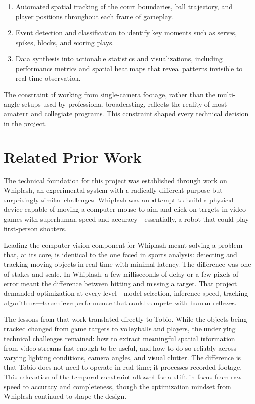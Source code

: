 \begin{enumerate}
    \item Automated spatial tracking of the court boundaries, ball trajectory, and player positions throughout each frame of gameplay.
    \item Event detection and classification to identify key moments such as serves, spikes, blocks, and scoring plays.
    \item Data synthesis into actionable statistics and visualizations, including performance metrics and spatial heat maps that reveal patterns invisible to real-time observation.
\end{enumerate}

The constraint of working from single-camera footage, rather than the multi-angle setups used by professional broadcasting, reflects the reality of most amateur and collegiate programs. This constraint shaped every technical decision in the project.

\section{Related Prior Work}

The technical foundation for this project was established through work on Whiplash, an experimental system with a radically different purpose but surprisingly similar challenges. Whiplash was an attempt to build a physical device capable of moving a computer mouse to aim and click on targets in video games with superhuman speed and accuracy—essentially, a robot that could play first-person shooters.

Leading the computer vision component for Whiplash meant solving a problem that, at its core, is identical to the one faced in sports analysis: detecting and tracking moving objects in real-time with minimal latency. The difference was one of stakes and scale. In Whiplash, a few milliseconds of delay or a few pixels of error meant the difference between hitting and missing a target. That project demanded optimization at every level—model selection, inference speed, tracking algorithms—to achieve performance that could compete with human reflexes.

The lessons from that work translated directly to Tobio. While the objects being tracked changed from game targets to volleyballs and players, the underlying technical challenges remained: how to extract meaningful spatial information from video streams fast enough to be useful, and how to do so reliably across varying lighting conditions, camera angles, and visual clutter. The difference is that Tobio does not need to operate in real-time; it processes recorded footage. This relaxation of the temporal constraint allowed for a shift in focus from raw speed to accuracy and completeness, though the optimization mindset from Whiplash continued to shape the design.
